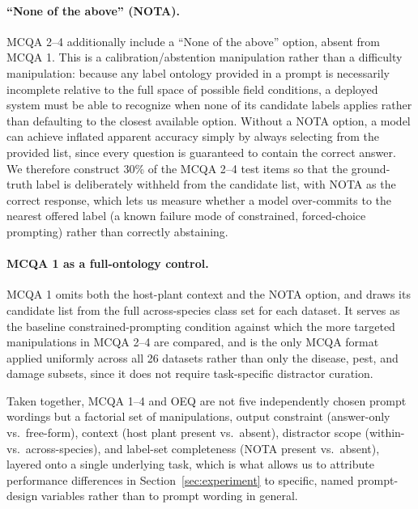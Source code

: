 \documentclass[10pt,letterpaper]{article}
\begin{document}
\paragraph{``None of the above'' (NOTA).} MCQA 2--4 additionally include a ``None of the above'' option, absent from MCQA 1. This is a calibration/abstention manipulation rather than a difficulty manipulation: because any label ontology provided in a prompt is necessarily incomplete relative to the full space of possible field conditions, a deployed system must be able to recognize when none of its candidate labels applies rather than defaulting to the closest available option. Without a NOTA option, a model can achieve inflated apparent accuracy simply by always selecting from the provided list, since every question is guaranteed to contain the correct answer. We therefore construct 30\% of the MCQA 2--4 test items so that the ground-truth label is deliberately withheld from the candidate list, with NOTA as the correct response, which lets us measure whether a model over-commits to the nearest offered label (a known failure mode of constrained, forced-choice prompting) rather than correctly abstaining.

\paragraph{MCQA 1 as a full-ontology control.} MCQA 1 omits both the host-plant context and the NOTA option, and draws its candidate list from the full across-species class set for each dataset. It serves as the baseline constrained-prompting condition against which the more targeted manipulations in MCQA 2--4 are compared, and is the only MCQA format applied uniformly across all 26 datasets rather than only the disease, pest, and damage subsets, since it does not require task-specific distractor curation.

Taken together, MCQA 1--4 and OEQ are not five independently chosen prompt wordings but a factorial set of manipulations, output constraint (answer-only vs.\ free-form), context (host plant present vs.\ absent), distractor scope (within- vs.\ across-species), and label-set completeness (NOTA present vs.\ absent), layered onto a single underlying task, which is what allows us to attribute performance differences in Section~\ref{sec:experiment} to specific, named prompt-design variables rather than to prompt wording in general.
\end{document}
